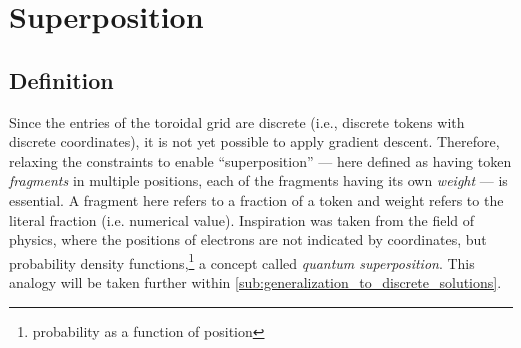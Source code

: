 \section{Superposition}%
\label{sec:superposition}

\subsection{Definition}%
\label{sub:superposition_definition}
Since the entries of the toroidal grid are discrete (i.e., discrete tokens with discrete coordinates), it is not yet possible to apply gradient descent. Therefore, relaxing the constraints to enable ``superposition'' --- here defined as having token \emph{fragments} in multiple positions, each of the fragments having its own \emph{weight} --- is essential. A fragment here refers to a fraction of a token and weight refers to the literal fraction (i.e. numerical value). Inspiration was taken from the field of physics, where the positions of electrons are not indicated by coordinates, but probability density functions,\footnote{probability as a function of position} a concept called \emph{quantum superposition}. This analogy will be taken further within \ref{sub:generalization_to_discrete_solutions}.



